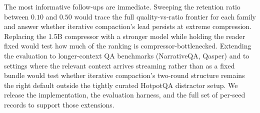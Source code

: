 \documentclass[10pt,twocolumn]{article}
\begin{document}
The most informative follow-ups are immediate. Sweeping the retention ratio between $0.10$ and $0.50$ would trace the full quality-vs-ratio frontier for each family and answer whether iterative compaction's lead persists at extreme compression. Replacing the 1.5B compressor with a stronger model while holding the reader fixed would test how much of the ranking is compressor-bottlenecked. Extending the evaluation to longer-context QA benchmarks (NarrativeQA, Qasper) and to settings where the relevant context arrives streaming rather than as a fixed bundle would test whether iterative compaction's two-round structure remains the right default outside the tightly curated HotpotQA distractor setup. We release the implementation, the evaluation harness, and the full set of per-seed records to support those extensions.

\FloatBarrier
\clearpage


\end{document}
